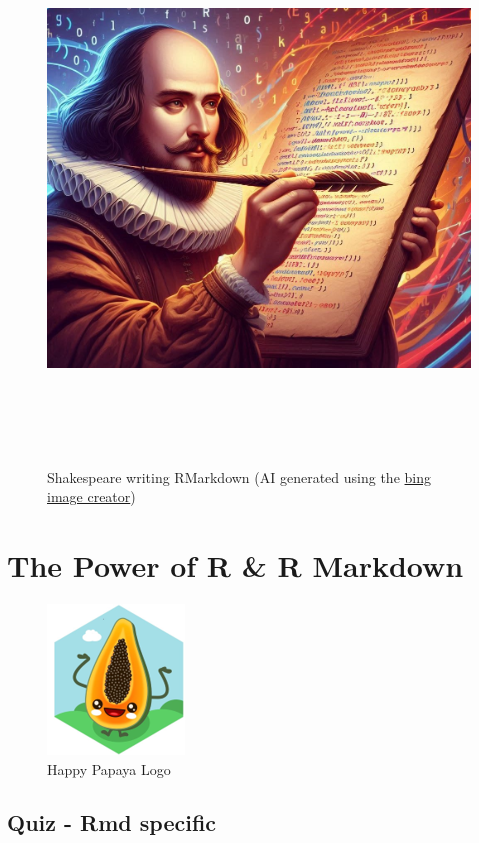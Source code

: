 \documentclass[
]{book}
\begin{document}
\begin{figure}
\centering
\includegraphics[width=\textwidth,height=5.72917in]{img/shakespeare.jpg}
\caption{Shakespeare writing RMarkdown (AI generated using the \href{https://www.bing.com/images/create}{bing image creator})}
\end{figure}

\chapter{The Power of R \& R Markdown}\label{the-power-of-r-r-markdown}

\begin{figure}
\centering
\includegraphics{./img/papaja.png}
\caption{Happy Papaya Logo}
\end{figure}

\section{Quiz - Rmd specific}\label{quiz---rmd-specific}
\end{document}
